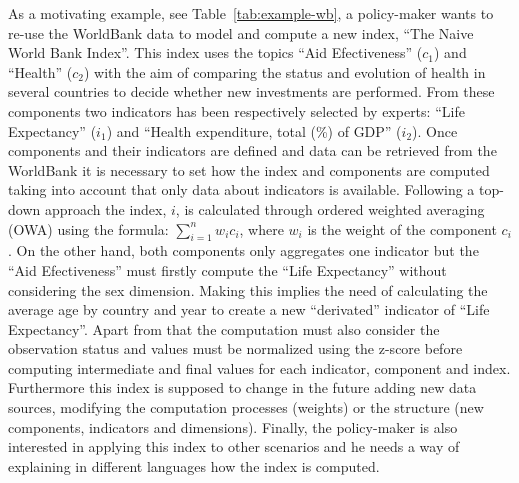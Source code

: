 \documentclass{llncs}
\begin{document}
%  
% 
% 
%  
%  
%  
 



As a motivating example, see Table~\ref{tab:example-wb}, a policy-maker wants to re-use the WorldBank data to model and compute a new index, ``The Naive World Bank Index''. This 
index uses the topics ``Aid Efectiveness'' ($c_1$) and ``Health'' ($c_2$) with the aim of comparing the status and evolution of health in several countries to decide whether new 
investments are performed. From these components two indicators has been respectively selected by experts: ``Life Expectancy'' ($i_1$) and ``Health expenditure, total (\%) of GDP'' ($i_2$). 
Once components and their indicators are defined and data can be retrieved from the WorldBank it is necessary to set how the index and components are computed 
taking into account that only data about indicators is available. Following a top-down approach the index, $i$, is calculated through ordered weighted averaging (OWA) using the 
formula: $\sum_{i=1}^n  w_i c_i$, where $w_i$ is the weight of the component $c_i$. On the other hand, both components only aggregates one indicator but the ``Aid Efectiveness'' 
must firstly compute the ``Life Expectancy'' without considering the sex dimension. Making this implies the need of calculating the average age by country and year to create 
a new ``derivated'' indicator of ``Life Expectancy''. Apart from that the computation must also consider the observation status and values must be normalized using the 
z-score before computing intermediate and final values for each indicator, component and index. Furthermore this index is supposed to change in the future 
adding new data sources, modifying the computation processes (weights) or the structure (new components, indicators and dimensions). Finally, the policy-maker 
is also interested in applying this index to other scenarios and he needs a way of explaining in different languages how the index is computed. 
\end{document}
